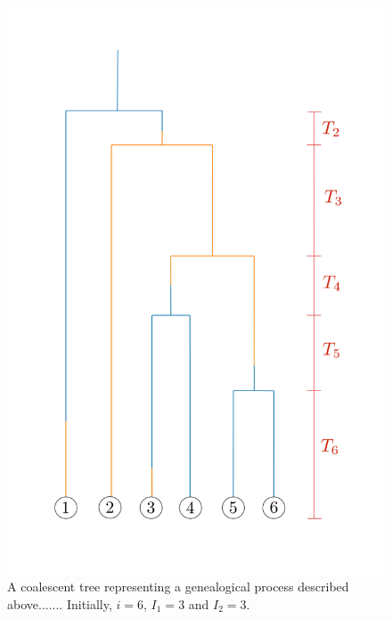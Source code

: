\documentclass[12pt,a4paper]{article}
\begin{document}
\begin{figure}
    \centering
    \includegraphics[width=\textwidth]{TwoIslandConstructionColours}
    \caption{A coalescent tree representing a genealogical process described above....... Initially, $i=6$, $I_1=3$ and $I_2=3$.}
   \label{TwoIslandTree}
\end{figure}
\end{document}

